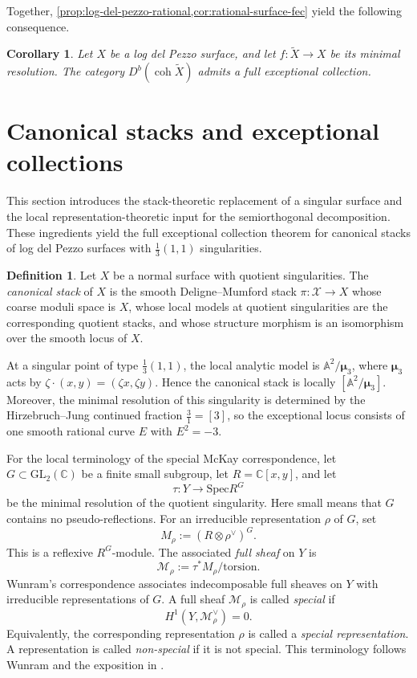 \documentclass[11pt]{article}
\theoremstyle{plain}
\newtheorem{corollary}[corollary]{Corollary}
\theoremstyle{definition}
\newtheorem{definition}[definition]{Definition}
\theoremstyle{remark}
\newcommand{\A}{\mathbb A}
\newcommand{\C}{\mathbb C}
\newcommand{\Db}{D^b}
\newcommand{\coh}{\operatorname{coh}}
\newcommand{\GL}{\mathrm{GL}}
\newcommand{\Spec}{\mathrm{Spec}}
\newcommand{\XX}{\mathcal X}
\newcommand{\muthree}{\boldsymbol{\mu}_3}
\begin{document}
Together, \cref{prop:log-del-pezzo-rational,cor:rational-surface-fec} yield the following consequence.

\begin{corollary}\label{cor:resolution-fec}
Let \(X\) be a log del Pezzo surface, and let \(f:\widetilde X\to X\) be its minimal resolution. The category \(\Db(\coh \widetilde X)\) admits a full exceptional collection.
\end{corollary}

\section{Canonical stacks and exceptional collections}
\label{sec:canonical-stack}

This section introduces the stack-theoretic replacement of a singular surface and the local representation-theoretic input for the semiorthogonal decomposition. These ingredients yield the full exceptional collection theorem for canonical stacks of log del Pezzo surfaces with \(\frac13(1,1)\) singularities.

\begin{definition}
Let \(X\) be a normal surface with quotient singularities. The \emph{canonical stack} of \(X\) is the smooth Deligne--Mumford stack \(\pi:\XX\to X\) whose coarse moduli space is \(X\), whose local models at quotient singularities are the corresponding quotient stacks, and whose structure morphism is an isomorphism over the smooth locus of \(X\).
\end{definition}

At a singular point of type \(\frac13(1,1)\), the local analytic model is \(\A^2/\muthree\), where \(\muthree\) acts by \(\zeta\cdot(x,y)=(\zeta x,\zeta y)\). Hence the canonical stack is locally \([\A^2/\muthree]\). Moreover, the minimal resolution of this singularity is determined by the Hirzebruch--Jung continued fraction \(\frac31=[3]\), so the exceptional locus consists of one smooth rational curve \(E\) with \(E^2=-3\).

For the local terminology of the special McKay correspondence, let \(G\subset \GL_2(\C)\) be a finite small subgroup, let \(R=\C[x,y]\), and let
\[
\tau:Y\longrightarrow \Spec R^G
\]
be the minimal resolution of the quotient singularity. Here small means that \(G\) contains no pseudo-reflections. For an irreducible representation \(\rho\) of \(G\), set
\[
M_\rho:=(R\otimes \rho^\vee)^G.
\]
This is a reflexive \(R^G\)-module. The associated \emph{full sheaf} on \(Y\) is
\[
\mathcal M_\rho:=\tau^*M_\rho/\text{torsion}.
\]
Wunram's correspondence associates indecomposable full sheaves on \(Y\) with irreducible representations of \(G\). A full sheaf \(\mathcal M_\rho\) is called \emph{special} if
\[
H^1(Y,\mathcal M_\rho^\vee)=0.
\]
Equivalently, the corresponding representation \(\rho\) is called a \emph{special representation}. A representation is called \emph{non-special} if it is not special. This terminology follows Wunram \cite{Wunram1988} and the exposition in \cite[Section~2]{Ishii2015}.
\end{document}
